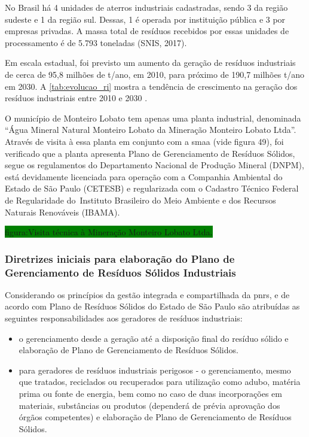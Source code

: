 	No Brasil há 4 unidades de aterros industriais cadastradas, sendo 3 da região sudeste e 1 da região sul. Dessas, 1 é operada por instituição pública e 3 por empresas privadas. A massa total de resíduos recebidos por essas unidades de processamento é de 5.793 toneladas (SNIS, 2017).
	
	Em escala estadual, foi previsto um aumento da geração de resíduos industriais de cerca de 95,8 milhões de t/ano, em 2010, para próximo de 190,7 milhões t/ano em 2030. A \autoref{tab:evolucao_ri} mostra a tendência de crescimento na geração dos resíduos industriais entre 2010 e 2030 \cite{PERS2014}.
	
	
	
	O município de Monteiro Lobato tem apenas uma planta industrial, denominada “Água Mineral Natural Monteiro Lobato da Mineração Monteiro Lobato Ltda”. Através de visita à essa planta em conjunto com a \gls{smaa} (vide figura 49), foi verificado que a planta apresenta Plano de Gerenciamento de Resíduos Sólidos, segue os regulamentos do Departamento Nacional de Produção Mineral (DNPM), está devidamente licenciada para operação com a Companhia Ambiental do Estado de São Paulo (CETESB) e regularizada com o Cadastro Técnico Federal de Regularidade do Instituto Brasileiro do Meio Ambiente e dos Recursos Naturais Renováveis (IBAMA).
	
	\colorbox{green}{figura:Visita técnica à Mineração Monteiro Lobato Ltda.}
	
	\subsubsection{Diretrizes iniciais para elaboração do Plano de Gerenciamento de Resíduos Sólidos Industriais}
	
	Considerando os princípios da gestão integrada e compartilhada da \gls{pnrs}, e de acordo com Plano de Resíduos Sólidos do Estado de São Paulo são atribuídas as seguintes responsabilidades aos geradores de resíduos industriais:
	
	\begin{itemize}
		\item o gerenciamento desde a geração até a disposição final do resíduo sólido e elaboração de Plano de Gerenciamento de Resíduos Sólidos.
		\item para geradores de resíduos industriais perigosos - o gerenciamento, mesmo que tratados, reciclados ou recuperados para utilização como adubo, matéria prima ou fonte de energia, bem como no caso de duas incorporações em materiais, substâncias ou produtos (dependerá de prévia aprovação dos órgãos competentes) e elaboração de Plano de Gerenciamento de Resíduos Sólidos.
	\end{itemize}

